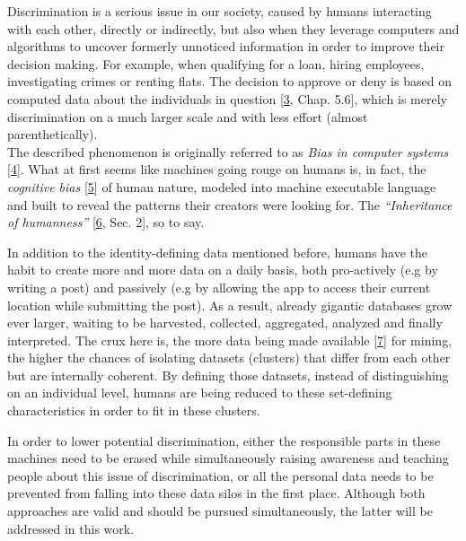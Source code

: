 \documentclass[12pt,english,a4paper,titlepage,cleardoublepage=empty,dottedtoc]{report}
\begin{document}
Discrimination is a serious issue in our society, caused by humans
interacting with each other, directly or indirectly, but also when they
leverage computers and algorithms to uncover formerly unnoticed
information in order to improve their decision making. For example, when
qualifying for a loan, hiring employees, investigating crimes or renting
flats. The decision to approve or deny is based on computed data about
the individuals in question
{[}\protect\hyperlink{ref-book_2015_ethical-it-innovation}{3}, Chap.
5.6{]}, which is merely discrimination on a much larger scale and with
less effort (almost parenthetically).\\
The described phenomenon is originally referred to as \emph{Bias in
computer systems}
{[}\protect\hyperlink{ref-paper_1996_bias-in-computer-systems}{4}{]}.
What at first seems like machines going rouge on humans is, in fact, the
\emph{cognitive bias}
{[}\protect\hyperlink{ref-wikipedia_2016_cognitive-bias}{5}{]} of human
nature, modeled into machine executable language and built to reveal the
patterns their creators were looking for. The \emph{``Inheritance of
humanness''} {[}\protect\hyperlink{ref-web_2016_big-data-is-people}{6},
Sec. 2{]}, so to say.

In addition to the identity-defining data mentioned before, humans have
the habit to create more and more data on a daily basis, both
pro-actively (e.g by writing a post) and passively (e.g by allowing the
app to access their current location while submitting the post). As a
result, already gigantic databases grow ever larger, waiting to be
harvested, collected, aggregated, analyzed and finally interpreted. The
crux here is, the more data being made available
{[}\protect\hyperlink{ref-video_2015_big-data-and-deep-learning_discrimination}{7}{]}
for mining, the higher the chances of isolating datasets (clusters) that
differ from each other but are internally coherent. By defining those
datasets, instead of distinguishing on an individual level, humans are
being reduced to these set-defining characteristics in order to fit in
these clusters.

In order to lower potential discrimination, either the responsible parts
in these machines need to be erased while simultaneously raising
awareness and teaching people about this issue of discrimination, or all
the personal data needs to be prevented from falling into these data
silos in the first place. Although both approaches are valid and should
be pursued simultaneously, the latter will be addressed in this work.
\end{document}
